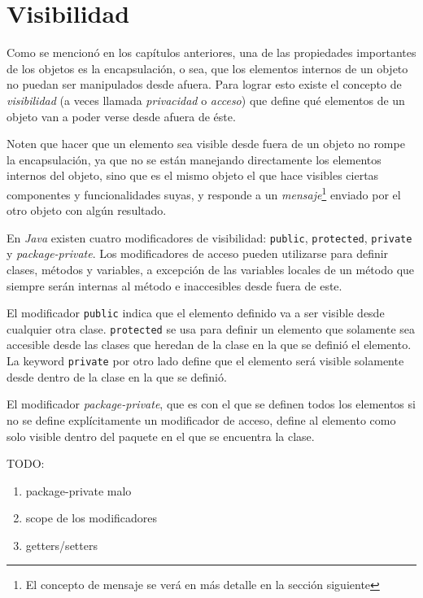 \section{Visibilidad}
  \label{sec:access-mod}

  Como se mencionó en los capítulos anteriores, una de las propiedades importantes de los objetos es
  la encapsulación, o sea, que los elementos internos de un objeto no puedan ser manipulados desde
  afuera.
  Para lograr esto existe el concepto de \textit{visibilidad} (a veces llamada 
  \textit{privacidad} o \textit{acceso}) que define qué elementos de un objeto van a poder verse 
  desde afuera de éste.

  Noten que hacer que un elemento sea visible desde fuera de un objeto no rompe la encapsulación, ya
  que no se están manejando directamente los elementos internos del objeto, sino que es el mismo 
  objeto el que hace visibles ciertas componentes y funcionalidades suyas, y responde a un 
  \textit{mensaje}\footnote{El concepto de mensaje se verá en más detalle en la sección siguiente} 
  enviado por el otro objeto con algún resultado.

  En \textit{Java} existen cuatro modificadores de visibilidad: \texttt{public}, 
  \texttt{protected}, \texttt{private} y \textit{package-private}.
  Los modificadores de acceso pueden utilizarse para definir clases, métodos y variables, a 
  excepción de las variables locales de un método que siempre serán internas al método e 
  inaccesibles desde fuera de este.

  El modificador \texttt{public} indica que el elemento definido va a ser visible desde 
  cualquier otra clase.
  \texttt{protected} se usa para definir un elemento que solamente sea accesible desde las
  clases que heredan de la clase en la que se definió el elemento.
  La keyword \texttt{private} por otro lado define que el elemento será visible solamente 
  desde dentro de la clase en la que se definió.

  El modificador \textit{package-private}, que es con el que se definen todos los elementos si no se
  define explícitamente un modificador de acceso, define al elemento como solo visible dentro del 
  paquete en el que se encuentra la clase.

  TODO:
  \begin{enumerate}
    \item package-private malo
    \item scope de los modificadores
    \item getters/setters
  \end{enumerate}
%